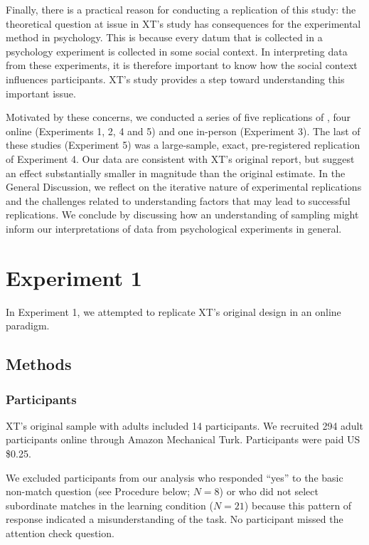 \documentclass[man]{apa2}
\begin{document}
Finally, there is a practical reason for conducting a replication of this study: the theoretical question at issue in XT's study has consequences for the experimental method in psychology. This is because every datum that is collected in a psychology experiment is collected in some social context. In interpreting data from these experiments, it is therefore important to know how the social context influences participants. XT's study provides a step toward understanding this important issue.

Motivated by these concerns, we conducted a series of five replications of , four online (Experiments 1, 2,  4 and 5) and one in-person (Experiment 3). The last of these studies (Experiment 5) was a large-sample, exact, pre-registered replication of Experiment 4. Our data are consistent with XT's original report, but suggest an effect substantially smaller in magnitude than the original estimate. In the General Discussion, we reflect on the iterative nature of experimental replications and the challenges related to understanding factors that may lead to successful replications. We conclude by discussing how an understanding of sampling might inform our interpretations of data from psychological experiments in general.

\section{Experiment 1} 
In Experiment 1, we attempted to replicate XT's original design in an online paradigm. 

\subsection{Methods}
\subsubsection{Participants} 
XT's original sample with adults included 14 participants. We recruited 294 adult participants online through Amazon Mechanical Turk. Participants were paid US \$0.25. 

We excluded participants from our analysis who responded ``yes'' to the basic non-match question (see Procedure below; $N=8$) or who did not select subordinate matches in the learning condition ($N = 21$) because this pattern of response indicated a misunderstanding of the task. No participant missed the attention check question. %
\end{document}
